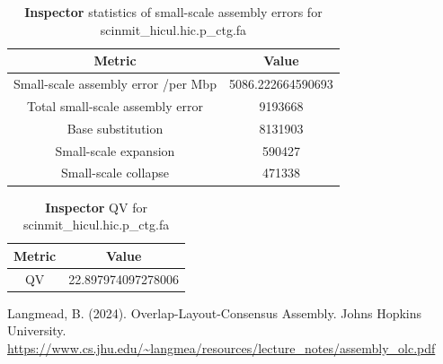 \documentclass[12pt]{article}
\begin{document}
\begin{table}[h!]
    \begin{center}
    \begin{tabular}{ |c|c| }
        \hline
        Metric & Value \\
        \hline
        Small-scale assembly error /per Mbp & 5086.222664590693 \\
        Total small-scale assembly error & 9193668 \\
        Base substitution & 8131903 \\
        Small-scale expansion & 590427 \\
        Small-scale collapse & 471338 \\
        \hline
    \end{tabular}
    \caption{\textbf{Inspector} statistics of small-scale assembly errors for scinmit\_hicul.hic.p\_ctg.fa}
    \label{tab:inspector_scinmit_hicul_small_scale_errors}
    \end{center}
    \end{table}

\begin{table}[h!]
    \begin{center}
    \begin{tabular}{ |c|c| }
        \hline
        Metric & Value \\
        \hline
        QV & 22.897974097278006 \\
        \hline
    \end{tabular}
    \caption{\textbf{Inspector} QV for scinmit\_hicul.hic.p\_ctg.fa}
    \label{tab:inspector_scinmit_hicul_qv}
    \end{center}
    \end{table}


\begin{thebibliography}{9}
Langmead, B. (2024). Overlap-Layout-Consensus Assembly. Johns Hopkins University. 
\url{https://www.cs.jhu.edu/~langmea/resources/lecture_notes/assembly_olc.pdf}
\end{thebibliography}
\end{document}
